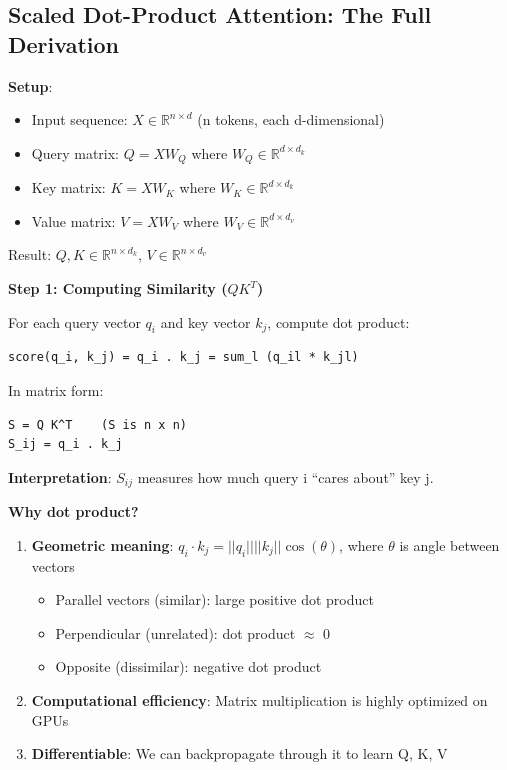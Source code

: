 \subsection{Scaled Dot-Product Attention: The Full Derivation}

\textbf{Setup}:
\begin{itemize}
\item Input sequence: $X \in \mathbb{R}^{n \times d}$ (n tokens, each d-dimensional)
\item Query matrix: $Q = XW_Q$ where $W_Q \in \mathbb{R}^{d \times d_k}$
\item Key matrix: $K = XW_K$ where $W_K \in \mathbb{R}^{d \times d_k}$
\item Value matrix: $V = XW_V$ where $W_V \in \mathbb{R}^{d \times d_v}$
\end{itemize}

Result: $Q, K \in \mathbb{R}^{n \times d_k}$, $V \in \mathbb{R}^{n \times d_v}$

\textbf{Step 1: Computing Similarity ($QK^T$)}

For each query vector $q_i$ and key vector $k_j$, compute dot product:
\begin{verbatim}
score(q_i, k_j) = q_i . k_j = sum_l (q_il * k_jl)
\end{verbatim}

In matrix form:
\begin{verbatim}
S = Q K^T    (S is n x n)
S_ij = q_i . k_j
\end{verbatim}

\textbf{Interpretation}: $S_{ij}$ measures how much query i ``cares about'' key j.

\textbf{Why dot product?}
\begin{enumerate}
\item \textbf{Geometric meaning}: $q_i \cdot k_j = ||q_i|| ||k_j|| \cos(\theta)$, where $\theta$ is angle between vectors
\begin{itemize}
\item Parallel vectors (similar): large positive dot product
\item Perpendicular (unrelated): dot product $\approx$ 0
\item Opposite (dissimilar): negative dot product
\end{itemize}

\item \textbf{Computational efficiency}: Matrix multiplication is highly optimized on GPUs

\item \textbf{Differentiable}: We can backpropagate through it to learn Q, K, V
\end{enumerate}

